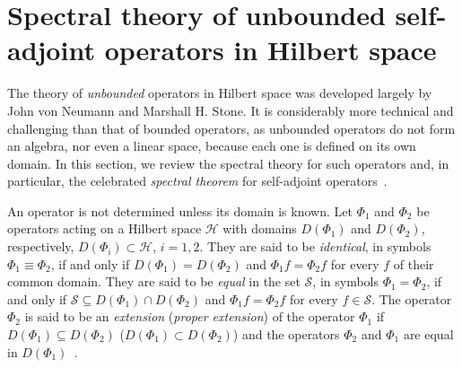 \documentclass[leqno,onefignum,onetabnum]{siamltex1213}
\newcommand{\Hs}{\mathscr{H}}
\begin{document}


\appendix
%

\section{Spectral theory of unbounded self-adjoint operators in
  Hilbert space} \label{sec:Spectral_Theory}    
%
The theory of \emph{unbounded} operators in Hilbert
space was developed largely by John von Neumann and Marshall H. Stone. It
is considerably more technical and challenging than that of bounded
operators, as unbounded operators do not form an algebra, nor even a
linear space, because each one is defined on its own domain. In this
section, we review the spectral theory for such operators and, in
particular, the celebrated \emph{spectral theorem} for self-adjoint
operators~\cite{Reed-1980,Stone:64}.


An operator is not determined unless its domain is known. Let $\Phi_1$
and $\Phi_2$ be operators acting on a Hilbert space $\Hs$ with domains
$D(\Phi_1)$ and $D(\Phi_2)$, 
respectively, $D(\Phi_i)\subset\Hs$, $i=1,2$. They are said to be
\emph{identical}, in symbols $\Phi_1\equiv\Phi_2$, if and only if $D(\Phi_1)=D(\Phi_2)$
and $\Phi_1 f=\Phi_2 f$ for every $f$ of their common domain. They are said
to be \emph{equal} in 
the set $\mathscr{S}$, in symbols $\Phi_1=\Phi_2$, if and only if
$\mathscr{S}\subseteq D(\Phi_1)\cap D(\Phi_2)$ and $\Phi_1 f=\Phi_2 f$ for every
$f\in\mathscr{S}$. The operator $\Phi_2$ is said to be an \emph{extension}
(\emph{proper extension}) of the operator $\Phi_1$ if $D(\Phi_1)\subseteq D(\Phi_2)$
($D(\Phi_1)\subset D(\Phi_2)$) and the operators $\Phi_2$ and $\Phi_1$ are equal in
$D(\Phi_1)$~\cite{Stone:64}.   
\end{document}
